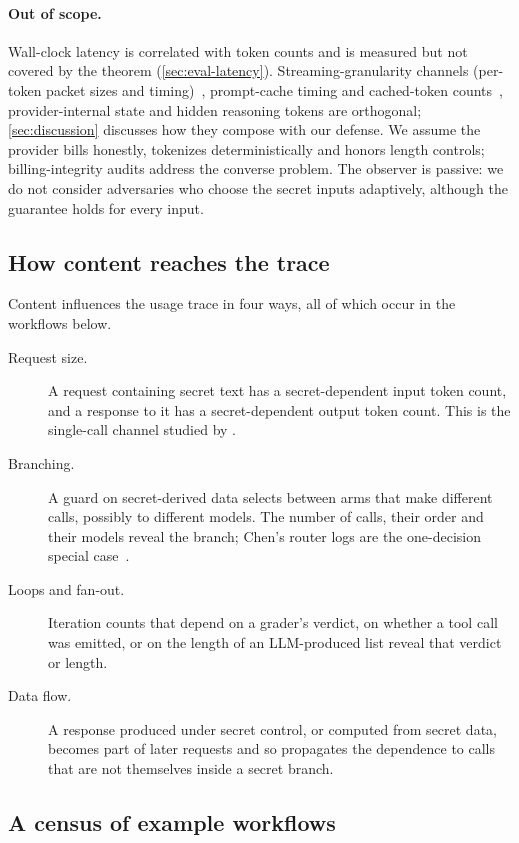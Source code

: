 \paragraph{Out of scope.} Wall-clock latency is correlated with token counts and is measured but not covered by the theorem (\cref{sec:eval-latency}). Streaming-granularity channels (per-token packet sizes and timing)~\cite{weiss2024keylog,mcdonald2025whisper,wei2024speculation}, prompt-cache timing and cached-token counts~\cite{gu2025caching,wu2025kvcache}, provider-internal state and hidden reasoning tokens are orthogonal; \cref{sec:discussion} discusses how they compose with our defense. We assume the provider bills honestly, tokenizes deterministically and honors length controls; billing-integrity audits address the converse problem. The observer is passive: we do not consider adversaries who choose the secret inputs adaptively, although the guarantee holds for every input.

\subsection{How content reaches the trace}\label{sec:leak-forms}

Content influences the usage trace in four ways, all of which occur in the workflows below.
\begin{description}
\item[Request size.] A request containing secret text has a secret-dependent input token count, and a response to it has a secret-dependent output token count. This is the single-call channel studied by \citet{zhang2024timewilltell}.
\item[Branching.] A guard on secret-derived data selects between arms that make different calls, possibly to different models. The number of calls, their order and their models reveal the branch; Chen's router logs are the one-decision special case~\cite{chen2026routing}.
\item[Loops and fan-out.] Iteration counts that depend on a grader's verdict, on whether a tool call was emitted, or on the length of an LLM-produced list reveal that verdict or length.
\item[Data flow.] A response produced under secret control, or computed from secret data, becomes part of later requests and so propagates the dependence to calls that are not themselves inside a secret branch.
\end{description}

\subsection{A census of example workflows}\label{sec:census}

